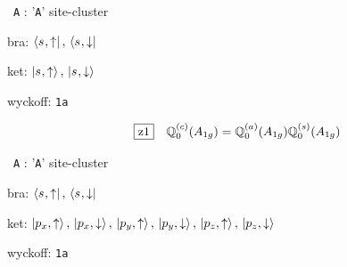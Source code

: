 \documentclass[fleqn,10pt,landscape]{jsarticle}
\begin{document}
\vspace{5mm}

\noindent\textbullet\, \texttt{A} : '\texttt{A}' site-cluster

\noindent\quad * bra: $\bra{s_{},\uparrow},\, \bra{s_{},\downarrow}$

\noindent\quad * ket: $\ket{s_{},\uparrow},\, \ket{s_{},\downarrow}$

\noindent\quad * wyckoff: \texttt{1a}

\begin{dmath*}
\hspace*{3mm}\fbox{z1}\quad \mathbb{Q}_{0}^{(c)}(A_{1g})=\mathbb{Q}_{0}^{(a)}(A_{1g}) \mathbb{Q}_{0}^{(s)}(A_{1g})
\end{dmath*}
\vspace{5mm}

\noindent\textbullet\, \texttt{A} : '\texttt{A}' site-cluster

\noindent\quad * bra: $\bra{s_{},\uparrow},\, \bra{s_{},\downarrow}$

\noindent\quad * ket: $\ket{p_{x},\uparrow},\, \ket{p_{x},\downarrow},\, \ket{p_{y},\uparrow},\, \ket{p_{y},\downarrow},\, \ket{p_{z},\uparrow},\, \ket{p_{z},\downarrow}$

\noindent\quad * wyckoff: \texttt{1a}
\end{document}
